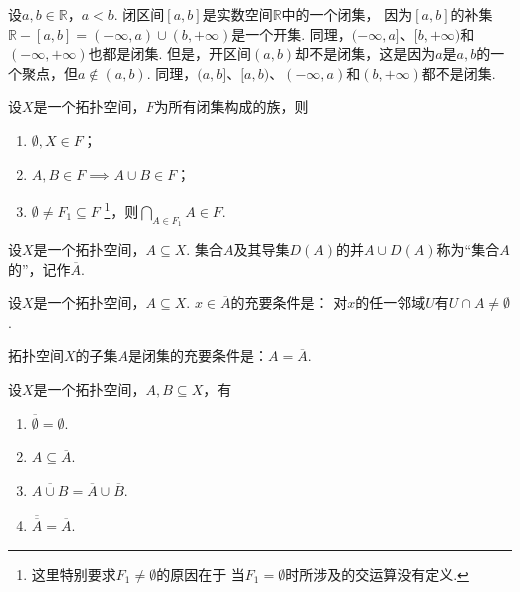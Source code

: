 \begin{example}
设\(a,b\in\mathbb{R}\)，\(a<b\).
闭区间\([a,b]\)是实数空间\(\mathbb{R}\)中的一个闭集，
因为\([a,b]\)的补集\(\mathbb{R}-[a,b]
=(-\infty,a)\cup(b,+\infty)\)是一个开集.
同理，\((-\infty,a]\)、\([b,+\infty)\)和\((-\infty,+\infty)\)也都是闭集.
但是，开区间\((a,b)\)却不是闭集，这是因为\(a\)是\(a,b\)的一个聚点，但\(a\notin(a,b)\).
同理，\((a,b]\)、\([a,b)\)、\((-\infty,a)\)和\((b,+\infty)\)都不是闭集.
\end{example}

\begin{theorem}\label{theorem:拓扑学.闭集族的性质}
设\(X\)是一个拓扑空间，\(F\)为所有闭集构成的族，则
\begin{enumerate}
	\item \(\emptyset,X \in F\)；
	\item \(A,B \in F \implies A \cup B \in F\)；
	\item \(\emptyset \neq F_1 \subseteq F\)
	\footnote{%
		这里特别要求\(F_1 \neq \emptyset\)的原因在于
		当\(F_1 = \emptyset\)时所涉及的交运算没有定义.
	}，则\(\bigcap\limits_{A \in F_1} A \in F\).
\end{enumerate}
\end{theorem}

\begin{definition}\label{definition:拓扑学.闭包的概念}
设\(X\)是一个拓扑空间，\(A \subseteq X\).
集合\(A\)及其导集\(D(A)\)的并\(A \cup D(A)\)称为“集合\(A\)的”，记作\(\overline{A}\).
\end{definition}

\begin{property}\label{theorem:拓扑学.一点属于闭包的充要条件}
设\(X\)是一个拓扑空间，\(A \subseteq X\).
\(x \in \overline{A}\)的充要条件是：
对\(x\)的任一邻域\(U\)有\(U \cap A \neq \emptyset\).
\end{property}

\begin{theorem}\label{theorem:拓扑学.成为闭集的充要条件2}
拓扑空间\(X\)的子集\(A\)是闭集的充要条件是：\(A = \overline{A}\).
\end{theorem}

\begin{theorem}\label{theorem:拓扑学.闭包的性质}
设\(X\)是一个拓扑空间，\(A,B \subseteq X\)，有
\begin{enumerate}
	\item \(\overline{\emptyset} = \emptyset\).
	\item \(A \subseteq \overline{A}\).
	\item \(\overline{A \cup B} = \overline{A} \cup \overline{B}\).
	\item \(\overline{\overline{A}} = \overline{A}\).
\end{enumerate}
\end{theorem}

